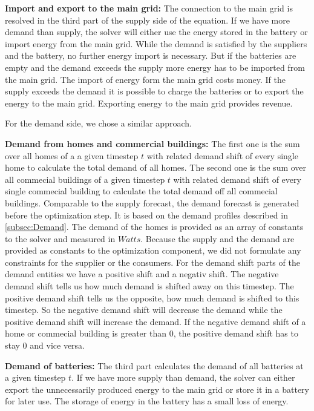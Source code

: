 \textbf{Import and export to the main grid:} The connection to the main grid is resolved in the third part of the supply side of the equation.
If we have more demand than supply, the solver will either use the energy stored in the battery or import energy from the main grid. While the demand is satisfied by the suppliers and the battery, no further energy import is necessary. But if the batteries are empty and the demand exceeds the supply more energy has to be imported from the main grid. The import of energy form the main grid costs money. If the supply exceeds the demand it is possible to charge the batteries or to export the energy to the main grid. Exporting energy to the main grid provides revenue.

For the demand side, we chose a similar approach.

\textbf{Demand from homes and commercial buildings:} The first one is the sum over all homes of a a given timestep $t$ with related demand shift of every single home to calculate the total demand of all homes.
The second one is the sum over all commecial buildings of a given timestep $t$ with related demand shift of every single commecial building to calculate the total demand off all commecial buildings.
Comparable to the supply forecast, the demand forecast is generated before the optimization step. 
It is based on the demand profiles described in \cref{subsec:Demand}. 
The demand of the homes is provided as an array of constants to the solver and measured in $Watts$. 
Because the supply and the demand are provided as constants to the optimization component, we did not formulate any constraints for the supplier or the consumers.
For the demand shift parts of the demand entities we have a positive shift and a negativ shift.
The negative demand shift tells us how much demand is shifted away on this timestep.
The positive demand shift tells us the opposite, how much demand is shifted to this timestep.
So the negative demand shift will decrease the demand while the positive demand shift will increase the demand.
If the negative demand shift of a home or commecial building is greater than 0, the positive demand shift has to stay 0 and vice versa.

\textbf{Demand of batteries:}
The third part calculates the demand of all batteries at a given timestep $t$.
If we have more supply than demand, the solver can either export the unnecessarily produced energy to the main grid or store it in a battery for later use.
The storage of energy in the battery has a small loss of energy.

